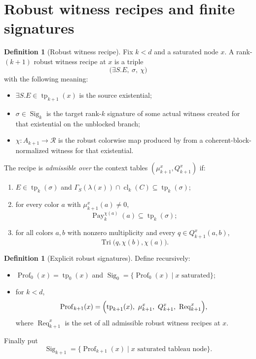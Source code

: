 \documentclass[11pt]{article}
\theoremstyle{definition}
\newtheorem{definition}[theorem]{Definition}
\newcommand{\Roles}{\mathcal{R}}
\newcommand{\cld}[2]{\operatorname{cl}_{#1}(#2)}
\newcommand{\tp}{\operatorname{tp}}
\newcommand{\Prof}{\operatorname{Prof}}
\newcommand{\Tri}{\operatorname{Tri}}
\newcommand{\Sig}{\operatorname{Sig}}
\newcommand{\Req}{\operatorname{Req}}
\newcommand{\Pay}{\operatorname{Pay}}
\begin{document}
\section{Robust witness recipes and finite signatures}

\begin{definition}[Robust witness recipe]
Fix $k<d$ and a saturated node $x$. A rank-$(k+1)$ robust witness recipe at $x$ is a triple
\[
\bigl(\exists S.E,\ \sigma,\ \chi\bigr)
\]
with the following meaning:
\begin{itemize}
  \item $\exists S.E\in \tp_{k+1}(x)$ is the source existential;
  \item $\sigma\in\Sig_k$ is the target rank-$k$ signature of some actual witness created for that existential on the unblocked branch;
  \item $\chi:A_{k+1}\to\Roles$ is the robust colorwise map produced by  from a coherent-block-normalized witness for that existential.
\end{itemize}
The recipe is \emph{admissible over} the context tables $(\mu^x_{k+1},Q^x_{k+1})$ if:
\begin{enumerate}[label=(\roman*)]
  \item $E\in \tp_k(\sigma)$ and $\Gamma_S(\lambda(x))\cap\cld{k}{C}\subseteq \tp_k(\sigma)$;
  \item for every color $a$ with $\mu^x_{k+1}(a)\neq 0$,
  \[
  \Pay^{{\chi(a)}}_k(a)\subseteq \tp_k(\sigma);
  \]
  \item for all colors $a,b$ with nonzero multiplicity and every $q\in Q^x_{k+1}(a,b)$,
  \[
  \Tri\bigl(q,\chi(b),\chi(a)\bigr).
  \]
\end{enumerate}
\end{definition}

\begin{definition}[Explicit robust signatures]
Define recursively:
\begin{itemize}
  \item $\Prof_0(x)=\tp_0(x)$ and $\Sig_0=\{\Prof_0(x)\mid x\text{ saturated}\}$;
  \item for $k<d$,
  \[
  \Prof_{k+1}(x)=\Bigl(\tp_{k+1}(x),\ \mu^x_{k+1},\ Q^x_{k+1},\ \Req^x_{k+1}\Bigr),
  \]
  where $\Req^x_{k+1}$ is the set of all admissible robust witness recipes at $x$.
\end{itemize}
Finally put
\[
\Sig_{k+1}=\{\Prof_{k+1}(x)\mid x\text{ saturated tableau node}\}.
\]
\end{definition}
\end{document}
